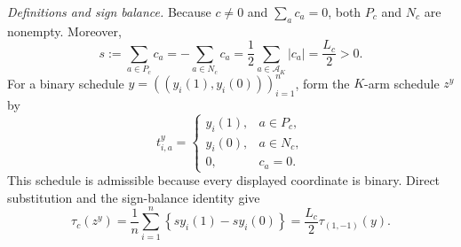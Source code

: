 \textit{Definitions and sign balance.}
Because \(c\neq0\) and \(\sum_a c_a=0\), both \(P_c\) and \(N_c\) are nonempty. Moreover,
\[
 s:=\sum_{a\in P_c}c_a
   =-\sum_{a\in N_c}c_a
   =\frac12\sum_{a\in\mathcal A_K}|c_a|
   =\frac{L_c}{2}>0.
\]
For a binary schedule \(y=((y_i(1),y_i(0)))_{i=1}^n\), form the \(K\)-arm schedule \(z^y\) by
\[
 t_{i,a}^y=
 \begin{cases}
 y_i(1),&a\in P_c,\\
 y_i(0),&a\in N_c,\\
 0,&c_a=0.
 \end{cases}
\]
This schedule is admissible because every displayed coordinate is binary. Direct substitution and the sign-balance identity give
\[
 \tau_c(z^y)
 =\frac1n\sum_{i=1}^n
   \left\{s y_i(1)-s y_i(0)\right\}
 =\frac{L_c}{2}\tau_{(1,-1)}(y).
 \tag{1}
\]

